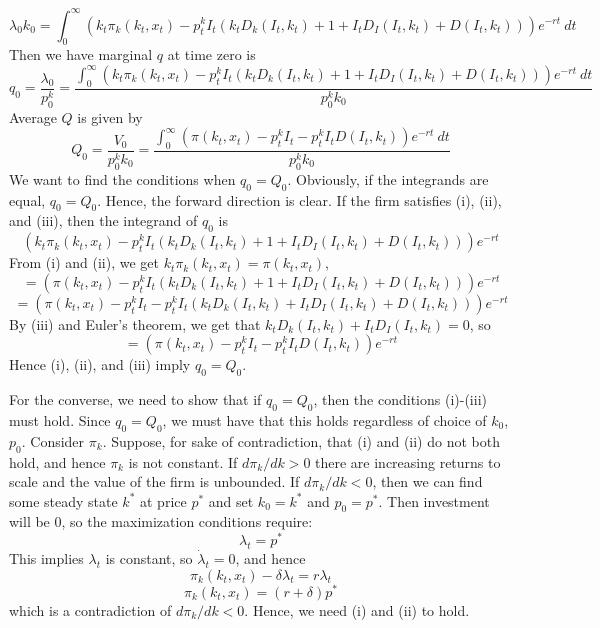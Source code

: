 \documentclass[10pt,letter]{article}
\begin{document}
\[ \lambda_0 k_0 = \int_0^\infty \left(k_t \pi_k(k_t, x_t) - p^k_t I_t (k_t D_k(I_t, k_t) + 1 + I_tD_I(I_t, k_t) + D(I_t, k_t)) \right) e^{-rt} \ dt \]
Then we have marginal $q$ at time zero is
\[ q_0 = \frac{\lambda_0}{p^k_0} = \frac{\int_0^\infty \left(k_t \pi_k(k_t, x_t) - p^k_t I_t (k_t D_k(I_t, k_t) + 1 + I_tD_I(I_t, k_t) + D(I_t, k_t)) \right) e^{-rt} \ dt}{p^k_0 k_0} \]
Average $Q$ is given by
\[ Q_0 = \frac{V_0}{p^k_0 k_0} = \frac{\int_0^\infty (\pi(k_t, x_t) - p^k_t I_t - p^k_t I_t D(I_t, k_t)) e^{-rt} \ dt}{p^k_0 k_0} \]
We want to find the conditions when $q_0 = Q_0$. Obviously, if the integrands are equal, $q_0 = Q_0$. Hence, the forward direction is clear. If the firm satisfies (i), (ii), and (iii), then the integrand of $q_0$ is
\[\left(k_t \pi_k(k_t, x_t) - p^k_t I_t (k_t D_k(I_t, k_t) + 1 + I_tD_I(I_t, k_t) + D(I_t, k_t)) \right) e^{-rt} \]
From (i) and (ii), we get $k_t \pi_k(k_t, x_t) = \pi(k_t, x_t)$,
\[ = \left( \pi(k_t, x_t) - p^k_t I_t (k_t D_k(I_t, k_t) + 1 + I_tD_I(I_t, k_t) + D(I_t, k_t)) \right) e^{-rt} \]
\[ = \left( \pi(k_t, x_t) - p^k_t I_t - p^k_t I_t (k_t D_k(I_t, k_t) + I_tD_I(I_t, k_t) + D(I_t, k_t)) \right) e^{-rt} \]
By (iii) and Euler's theorem, we get that $k_t D_k(I_t, k_t) + I_t D_I(I_t, k_t) = 0$, so
\[ = \left( \pi(k_t, x_t) - p^k_t I_t - p^k_t I_t  D(I_t, k_t) \right) e^{-rt} \]
Hence (i), (ii), and (iii) imply $q_0 = Q_0$.

For the converse, we need to show that if $q_0 = Q_0$, then the conditions (i)-(iii) must hold. Since $q_0 = Q_0$, we must have that this holds regardless of choice of $k_0$, $p_0$. Consider $\pi_k$. Suppose, for sake of contradiction, that (i) and (ii) do not both hold, and hence $\pi_k$ is not constant. If $d\pi_k/dk > 0$ there are increasing returns to scale and the value of the firm is unbounded. If $d\pi_k/dk < 0$, then we can find some steady state $k^*$ at price $p^*$ and set $k_0 = k^*$ and $p_0 = p^*$. Then investment will be 0, so the maximization conditions require:
\[ \lambda_t = p^* \]
This implies $\lambda_t$ is constant, so $\dot{\lambda}_t = 0$, and hence
\[ \pi_k(k_t, x_t) - \delta \lambda_t = r \lambda_t \]
\[ \pi_k(k_t, x_t) = (r+\delta) p^* \]
which is a contradiction of $d\pi_k/dk < 0$. Hence, we need (i) and (ii) to hold.
\end{document}

